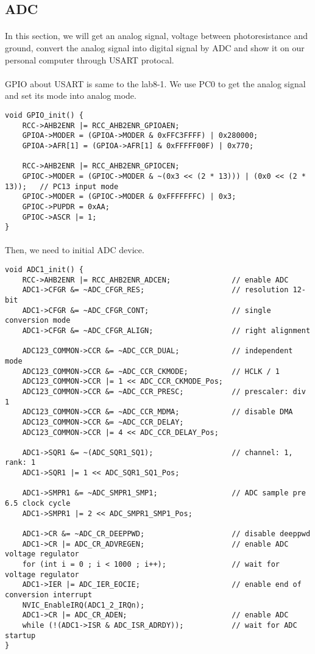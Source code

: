 \subsection{ADC}
\paragraph{}
In this section, we will get an analog signal, voltage between photoresistance and ground,  convert the analog signal into digital signal by ADC and show it on our personal computer through USART protocal. 
\paragraph{}
GPIO about USART is same to the lab8-1. We use PC0 to get the analog signal and set its mode into analog mode.
\begin{lstlisting}
void GPIO_init() {
    RCC->AHB2ENR |= RCC_AHB2ENR_GPIOAEN;
    GPIOA->MODER = (GPIOA->MODER & 0xFFC3FFFF) | 0x280000;
    GPIOA->AFR[1] = (GPIOA->AFR[1] & 0xFFFFF00F) | 0x770;

    RCC->AHB2ENR |= RCC_AHB2ENR_GPIOCEN;
    GPIOC->MODER = (GPIOC->MODER & ~(0x3 << (2 * 13))) | (0x0 << (2 * 13));   // PC13 input mode
    GPIOC->MODER = (GPIOC->MODER & 0xFFFFFFFC) | 0x3;
    GPIOC->PUPDR = 0xAA;
    GPIOC->ASCR |= 1;
}
\end{lstlisting}
\paragraph{}
Then, we need to initial ADC device.
\begin{lstlisting}
void ADC1_init() {
	RCC->AHB2ENR |= RCC_AHB2ENR_ADCEN;              // enable ADC
    ADC1->CFGR &= ~ADC_CFGR_RES;                    // resolution 12-bit
    ADC1->CFGR &= ~ADC_CFGR_CONT;                   // single conversion mode
    ADC1->CFGR &= ~ADC_CFGR_ALIGN;                  // right alignment

    ADC123_COMMON->CCR &= ~ADC_CCR_DUAL;            // independent mode
    ADC123_COMMON->CCR &= ~ADC_CCR_CKMODE;          // HCLK / 1
    ADC123_COMMON->CCR |= 1 << ADC_CCR_CKMODE_Pos;
    ADC123_COMMON->CCR &= ~ADC_CCR_PRESC;           // prescaler: div 1
    ADC123_COMMON->CCR &= ~ADC_CCR_MDMA;            // disable DMA
    ADC123_COMMON->CCR &= ~ADC_CCR_DELAY;
    ADC123_COMMON->CCR |= 4 << ADC_CCR_DELAY_Pos;

    ADC1->SQR1 &= ~(ADC_SQR1_SQ1);                  // channel: 1, rank: 1
    ADC1->SQR1 |= 1 << ADC_SQR1_SQ1_Pos;

    ADC1->SMPR1 &= ~ADC_SMPR1_SMP1;                 // ADC sample pre 6.5 clock cycle
    ADC1->SMPR1 |= 2 << ADC_SMPR1_SMP1_Pos;

    ADC1->CR &= ~ADC_CR_DEEPPWD;                    // disable deeppwd
    ADC1->CR |= ADC_CR_ADVREGEN;                    // enable ADC voltage regulator
    for (int i = 0 ; i < 1000 ; i++);               // wait for voltage regulator
    ADC1->IER |= ADC_IER_EOCIE;                     // enable end of conversion interrupt
    NVIC_EnableIRQ(ADC1_2_IRQn);
    ADC1->CR |= ADC_CR_ADEN;                        // enable ADC
    while (!(ADC1->ISR & ADC_ISR_ADRDY));           // wait for ADC startup
}
\end{lstlisting}
